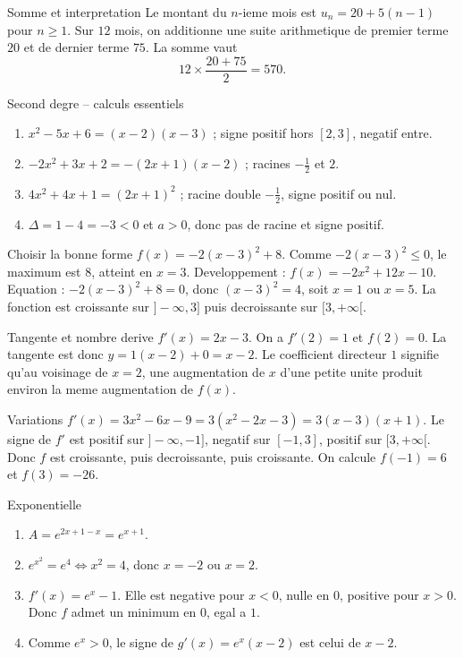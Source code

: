 \documentclass[11pt,a4paper]{article}
\begin{document}
\begin{corrbox}{Somme et interpretation}
Le montant du $n$-ieme mois est $u_n=20+5(n-1)$ pour $n\ge1$. Sur $12$ mois, on additionne une suite arithmetique de premier terme $20$ et de dernier terme $75$. La somme vaut
\[
12\times\frac{20+75}{2}=570.
\]
\end{corrbox}

\begin{corrbox}{Second degre -- calculs essentiels}
\begin{enumerate}
  \item $x^2-5x+6=(x-2)(x-3)$ ; signe positif hors $[2,3]$, negatif entre.
  \item $-2x^2+3x+2=-(2x+1)(x-2)$ ; racines $-\frac12$ et $2$.
  \item $4x^2+4x+1=(2x+1)^2$ ; racine double $-\frac12$, signe positif ou nul.
  \item $\Delta=1-4=-3<0$ et $a>0$, donc pas de racine et signe positif.
\end{enumerate}
\end{corrbox}

\begin{corrbox}{Choisir la bonne forme}
$f(x)=-2(x-3)^2+8$. Comme $-2(x-3)^2\le0$, le maximum est $8$, atteint en $x=3$. Developpement : $f(x)=-2x^2+12x-10$. Equation : $-2(x-3)^2+8=0$, donc $(x-3)^2=4$, soit $x=1$ ou $x=5$. La fonction est croissante sur $]-\infty,3]$ puis decroissante sur $[3,+\infty[$.
\end{corrbox}

\begin{corrbox}{Tangente et nombre derive}
$f'(x)=2x-3$. On a $f'(2)=1$ et $f(2)=0$. La tangente est donc $y=1(x-2)+0=x-2$. Le coefficient directeur $1$ signifie qu'au voisinage de $x=2$, une augmentation de $x$ d'une petite unite produit environ la meme augmentation de $f(x)$.
\end{corrbox}

\begin{corrbox}{Variations}
$f'(x)=3x^2-6x-9=3(x^2-2x-3)=3(x-3)(x+1)$. Le signe de $f'$ est positif sur $]-\infty,-1]$, negatif sur $[-1,3]$, positif sur $[3,+\infty[$. Donc $f$ est croissante, puis decroissante, puis croissante. On calcule $f(-1)=6$ et $f(3)=-26$.
\end{corrbox}

\begin{corrbox}{Exponentielle}
\begin{enumerate}
  \item $A=e^{2x+1-x}=e^{x+1}$.
  \item $e^{x^2}=e^4 \Longleftrightarrow x^2=4$, donc $x=-2$ ou $x=2$.
  \item $f'(x)=e^x-1$. Elle est negative pour $x<0$, nulle en $0$, positive pour $x>0$. Donc $f$ admet un minimum en $0$, egal a $1$.
  \item Comme $e^x>0$, le signe de $g'(x)=e^x(x-2)$ est celui de $x-2$.
\end{enumerate}
\end{corrbox}
\end{document}
